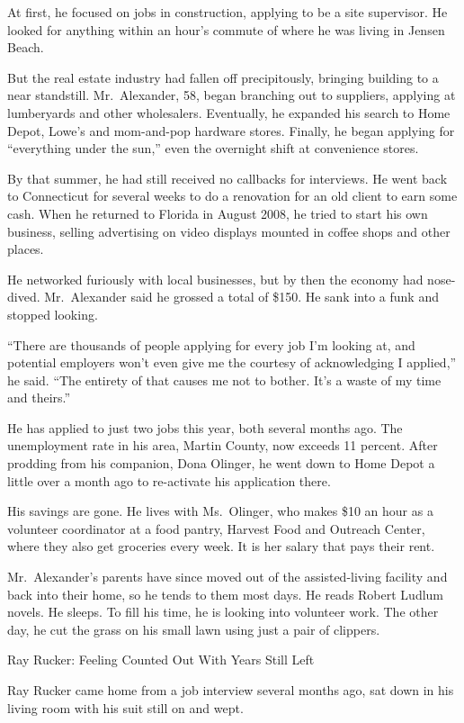 ﻿\documentclass[12pt]{article}
\begin{document}
At first, he focused on jobs in construction, applying to be a site supervisor. He looked for
anything within an hour's commute of where he was living in Jensen Beach.

But the real estate industry had fallen off precipitously, bringing building to a near standstill.
Mr.~Alexander, 58, began branching out to suppliers, applying at lumberyards and other wholesalers.
Eventually, he expanded his search to Home Depot, Lowe's and mom-and-pop hardware stores. Finally,
he began applying for ``everything under the sun,'' even the overnight shift at convenience stores.

By that summer, he had still received no callbacks for interviews. He went back to Connecticut for
several weeks to do a renovation for an old client to earn some cash. When he returned to Florida in
August 2008, he tried to start his own business, selling advertising on video displays mounted in
coffee shops and other places.

He networked furiously with local businesses, but by then the economy had nose-dived. Mr.~Alexander
said he grossed a total of \$150. He sank into a funk and stopped looking.

``There are thousands of people applying for every job I'm looking at, and potential employers won't
even give me the courtesy of acknowledging I applied,'' he said. ``The entirety of that causes me
not to bother. It's a waste of my time and theirs.''

He has applied to just two jobs this year, both several months ago. The unemployment rate in his
area, Martin County, now exceeds 11 percent. After prodding from his companion, Dona Olinger, he
went down to Home Depot a little over a month ago to re-activate his application there.

His savings are gone. He lives with Ms.~Olinger, who makes \$10 an hour as a volunteer coordinator
at a food pantry, Harvest Food and Outreach Center, where they also get groceries every week. It is
her salary that pays their rent.

Mr.~Alexander's parents have since moved out of the assisted-living facility and back into their
home, so he tends to them most days. He reads Robert Ludlum novels. He sleeps. To fill his time, he
is looking into volunteer work. The other day, he cut the grass on his small lawn using just a pair
of clippers.

Ray Rucker: Feeling Counted Out With Years Still Left

Ray Rucker came home from a job interview several months ago, sat down in his living room with his
suit still on and wept.
\end{document}
